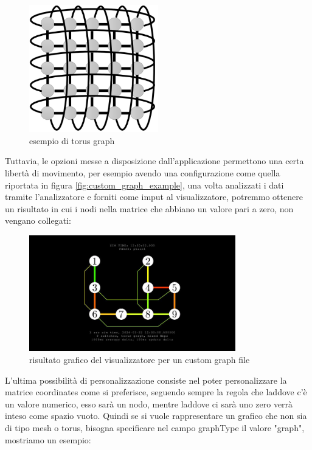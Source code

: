 \documentclass[binding=0.6cm]{sapthesis}
\begin{document}
\begin{figure}[h]
    \centering
    \includegraphics[width=0.5\textwidth]{immagini/torus_graph.png}
    \caption{esempio di torus graph \cite{torusgraph}}
    \label{fig:torus_graph}
\end{figure}

Tuttavia, le opzioni messe a disposizione dall'applicazione permettono una certa libertà di movimento,
per esempio avendo una configurazione come quella riportata in figura \ref{fig:custom_graph_example},
una volta analizzati i dati tramite l'analizzatore e forniti come imput al visualizzatore, potremmo ottenere
un risultato in cui i nodi nella matrice che abbiano un valore pari a zero, non vengano
collegati:
\begin{figure}[h]
    \centering
    \includegraphics[width=0.8\textwidth]{immagini/only_links.JPG}
    \caption{risultato grafico del visualizzatore per un custom graph file}
    \label{fig:hybrid_custom_torus}
\end{figure}

L'ultima possibilità di personalizzazione consiste nel poter personalizzare la matrice coordinates come si preferisce, seguendo sempre la regola
che laddove c'è un valore numerico, esso sarà un nodo, mentre laddove ci sarà uno zero verrà inteso come spazio vuoto. Quindi se si vuole rappresentare
un grafico che non sia di tipo mesh o torus, bisogna specificare nel campo graphType il valore "graph", mostriamo un esempio:
\end{document}

